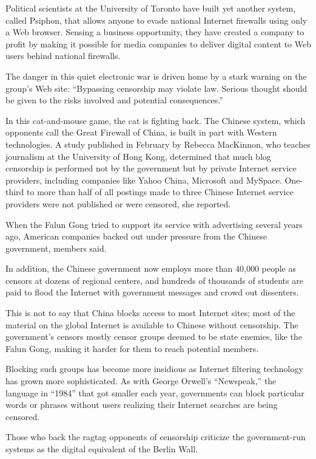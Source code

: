 \documentclass[12pt,a4paper,onecolumn]{article}
\begin{document}
Political scientists at the University of Toronto have built yet another system, called Psiphon,
that allows anyone to evade national Internet firewalls using only a Web browser. Sensing a business
opportunity, they have created a company to profit by making it possible for media companies to
deliver digital content to Web users behind national firewalls.

The danger in this quiet electronic war is driven home by a stark warning on the group's Web site:
``Bypassing censorship may violate law. Serious thought should be given to the risks involved and
potential consequences.''

In this cat-and-mouse game, the cat is fighting back. The Chinese system, which opponents call the
Great Firewall of China, is built in part with Western technologies. A study published in February
by Rebecca MacKinnon, who teaches journalism at the University of Hong Kong, determined that much
blog censorship is performed not by the government but by private Internet service providers,
including companies like Yahoo China, Microsoft and MySpace. One-third to more than half of all
postings made to three Chinese Internet service providers were not published or were censored, she
reported.

When the Falun Gong tried to support its service with advertising several years ago, American
companies backed out under pressure from the Chinese government, members said.

In addition, the Chinese government now employs more than 40,000 people as censors at dozens of
regional centers, and hundreds of thousands of students are paid to flood the Internet with
government messages and crowd out dissenters.

This is not to say that China blocks access to most Internet sites; most of the material on the
global Internet is available to Chinese without censorship. The government's censors mostly censor
groups deemed to be state enemies, like the Falun Gong, making it harder for them to reach potential
members.

Blocking such groups has become more insidious as Internet filtering technology has grown more
sophisticated. As with George Orwell's ``Newspeak,'' the language in ``1984'' that got smaller each
year, governments can block particular words or phrases without users realizing their Internet
searches are being censored.

Those who back the ragtag opponents of censorship criticize the government-run systems as the
digital equivalent of the Berlin Wall.
\end{document}
